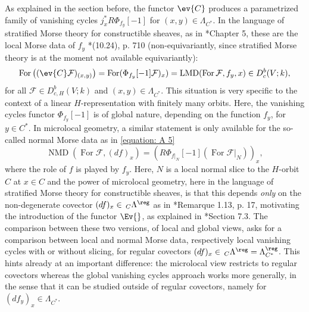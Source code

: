 \documentclass[11pt,letterpaper]{amsart}
\numberwithin{equation}{section}
\begin{document}
As explained in the section before, the functor $\ev{C}$ produces a parametrized family of vanishing cycles $j_x^* R\Phi_{f_y}[-1]$ for $(x,y)\in \Lambda_{C^*}$.
In the language of stratified Morse theory for constructible sheaves, as in \cite{Sch03}*{Chapter 5}, these are the local Morse data of $f_y$ \cite{MS22}*{(10.24), p. 710} (non-equivariantly, since stratified Morse theory is at the moment not available equivariantly): 
\begin{equation}\label{LMD-family}
\operatorname{For} \left((\ev{C}\mathcal{F})_{(x,y)}\right)
=
\operatorname{For} (\Phi_{f_y}[-1]\mathcal{F})_x )
=
\operatorname{LMD}(\operatorname{For}\mathcal{F},f_y,x)
\in D^b_{c}(V;k),
\end{equation}
for all $\mathcal{F}\in D^b_{c,H}(V;k)$ and $(x,y)\in \Lambda_{C^*}$.
This situation is very specific to the context of  a linear $H$-representation with finitely many orbits.
Here, the vanishing cycles functor $\Phi_{f_y}[-1]$ is of global nature, depending on the function $f_y$, for $y\in C^*$.
In microlocal geometry, a similar statement is only available for the so-called normal Morse data as in \eqref{equation: A 5}
\begin{equation}\label{NMD-family}
\operatorname{NMD}(\operatorname{For}\mathcal{F},(df)_x)
=
\left(R\Phi_{f\vert_{N}}[-1](\operatorname{For}\mathcal{F}\vert_{N})\right)_x,
\end{equation}
where the role of $f$ is played by $f_y$.
Here, $N$ is a local normal slice to the $H$-orbit $C$ at $x\in C$ and the power of microlocal geometry, here in the language of stratified Morse theory for constructible sheaves, is that this depends {\it only} on the non-degenerate covector $(df)_x \in \,_{C}\Lambda^\reg$ as in \cite{Bry86}*{Remarque 1.13, p. 17}, motivating the introduction of the functor $\Ev{}$, as explained in \cite{CFMMX22}*{Section 7.3}.
The comparison between these two versions, of local and global views, asks for a comparison between local and normal Morse data, respectively local vanishing cycles with or without slicing, for regular covectors 
$(df)_x \in \,_{C}\Lambda^\reg=\Lambda_{C^*}^\reg$.
This hints already at an important difference: the microlocal view restricts to regular covectors whereas the global vanishing cycles approach works more generally, in the sense that it can be studied outside of regular covectors, namely for $(df_y)_x \in \Lambda_{C^*}$. \\
\end{document}
